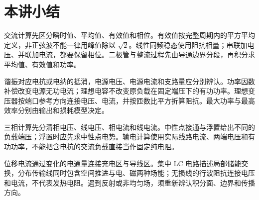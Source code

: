 \section{本讲小结}
交流计算先区分瞬时值、平均值、有效值和相位。有效值按完整周期内的平方平均定义，非正弦波不能一律用峰值除以 $\sqrt2$。线性同频稳态使用阻抗相量；串联加电压、并联加电流，都要保留相位。二极管与整流过程先由导通边界分段，再积分求平均值、有效值和功率。

谐振对应电抗或电纳的抵消，电源电压、电源电流和支路量应分别辨认。功率因数补偿改变电源无功电流；理想电容不改变原负载在固定端压下的有功功率。理想变压器按端口参考方向连接电压、电流，并按匝数比平方折算阻抗。最大功率与最高效率分别由输出和损耗模型决定。

三相计算先分清相电压、线电压、相电流和线电流。中性点接通与浮置给出不同的负载端压；浮置时应先求中性点电势。输电计算使用实际线路电流、两端电压和有功功率，不能把含电抗的交流负载直接当作固定纯电阻。

位移电流通过变化的电通量连接充电区与导线区。集中 LC 电路描述局部储能交换，分布传输线同时包含空间推进与电、磁两种场能；无损线的行波阻抗连接电压和电流，不代表发热电阻。遇到反射或非均匀场，须重新辨认积分面、边界和传播方向。

